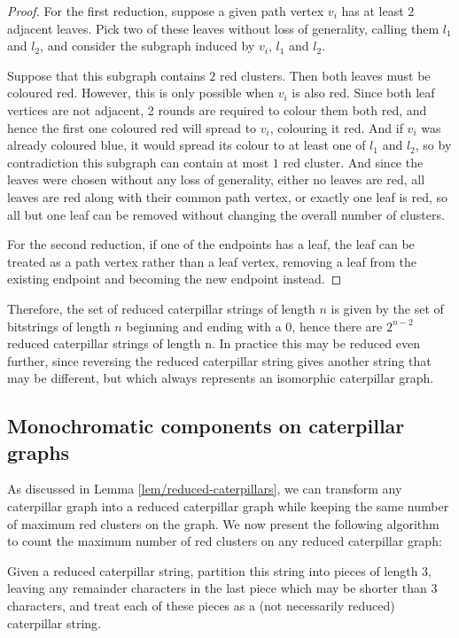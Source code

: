 \documentclass{mpaper}
\begin{document}
\begin{proof}

For the first reduction, suppose a given path vertex $v_i$ has at least $2$ adjacent leaves. Pick two of these leaves without loss of generality, calling them $l_1$ and $l_2$, and consider the subgraph induced by $v_i$, $l_1$ and $l_2$.

Suppose that this subgraph contains $2$ red clusters. Then both leaves must be coloured red. However, this is only possible when $v_i$ is also red. Since both leaf vertices are not adjacent, 2 rounds are required to colour them both red, and hence the first one coloured red will spread to $v_i$, colouring it red. And if $v_i$ was already coloured blue, it would spread its colour to at least one of $l_1$ and $l_2$, so by contradiction this subgraph can contain at most $1$ red cluster. And since the leaves were chosen without any loss of generality, either no leaves are red, all leaves are red along with their common path vertex, or exactly one leaf is red, so all but one leaf can be removed without changing the overall number of clusters.

For the second reduction, if one of the endpoints has a leaf, the leaf can be treated as a path vertex rather than a leaf vertex, removing a leaf from the existing endpoint and becoming the new endpoint instead.
\end{proof}

Therefore, the set of reduced caterpillar strings of length $n$ is given by the set of bitstrings of length $n$ beginning and ending with a $0$, hence there are $2^{n-2}$ reduced caterpillar strings of length n. In practice this may be reduced even further, since reversing the reduced caterpillar string gives another string that may be different, but which always represents an isomorphic caterpillar graph.

\subsection{Monochromatic components on caterpillar graphs}

As discussed in Lemma \ref{lem/reduced-caterpillars}, we can transform any caterpillar graph into a reduced caterpillar graph while keeping the same number of maximum red clusters on the graph. We now present the following algorithm to count the maximum number of red clusters on any reduced caterpillar graph:

Given a reduced caterpillar string, partition this string into pieces of length 3, leaving any remainder characters in the last piece which may be shorter than 3 characters, and treat each of these pieces as a (not necessarily reduced) caterpillar string.
\end{document}
